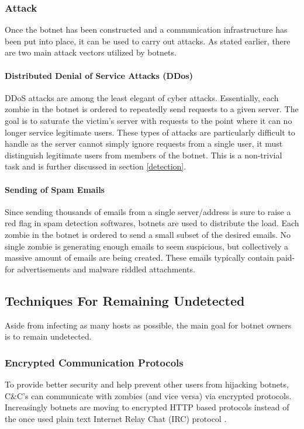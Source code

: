 \subsubsection{Attack}
Once the botnet has been constructed and a communication infrastructure has been put into
place, it can be used to carry out attacks.  As stated earlier, there are two
main attack vectors utilized by botnets.

\paragraph{Distributed Denial of Service Attacks (DDos)}
DDoS attacks are among the least elegant of cyber attacks. Essentially, each
zombie in the botnet is ordered to repeatedly send requests to a given server.
The goal is to saturate the victim's server with requests to the point where it
can no longer service legitimate users.  These types of attacks are particularly
difficult to handle as the server cannot simply ignore requests from a single user,
it must distinguish legitimate users from members of the botnet.
This is a non-trivial task and is further discussed in section \ref{detection}.

\paragraph{Sending of Spam Emails}
Since sending thousands of emails from a single server/address is sure to raise a red flag
in spam detection softwares, botnets are used to distribute the load.  Each zombie
in the botnet is ordered to send a small subset of the desired emails. No single zombie
is generating enough emails to seem suspicious, but collectively a massive amount
of emails are being created. These emails typically contain paid-for advertisements
and malware riddled attachments.

\subsection{Techniques For Remaining Undetected}
Aside from infecting as many hosts as possible, the main goal for botnet owners
is to remain undetected.

\subsubsection{Encrypted Communication Protocols}
To provide better security and help prevent other users from hijacking botnets,
C\&C's can communicate with zombies (and vice versa) via encrypted protocols.
Increasingly botnets are moving to encrypted HTTP based protocols instead of
the once used plain text Internet Relay Chat (IRC) protocol \cite{botlab}.

